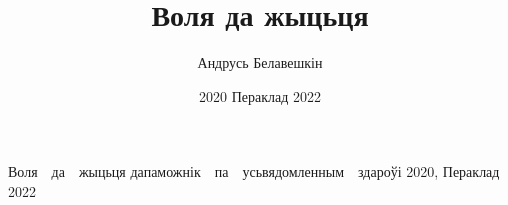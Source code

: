 \documentclass[ebook,10pt,openany]{memoir}
\author{Андрусь Белавешкін}
\title{Воля да жыцьця}
\date{2020 Пераклад 2022}
\begin{document}

\cleartooddpage
\begin{titlingpage}
      {Воля\ \ да\ \ жыцьця}
      {дапаможнік\ \ па\ \ усьвядомленным\ \ здароўі}
      {2020, Пераклад 2022}

% 

\end{titlingpage}

\pagestyle{headings}
\setcounter{page}{3}
\setcounter{tocdepth}{0}
\tableofcontents*
\clearpage

















\end{document}
